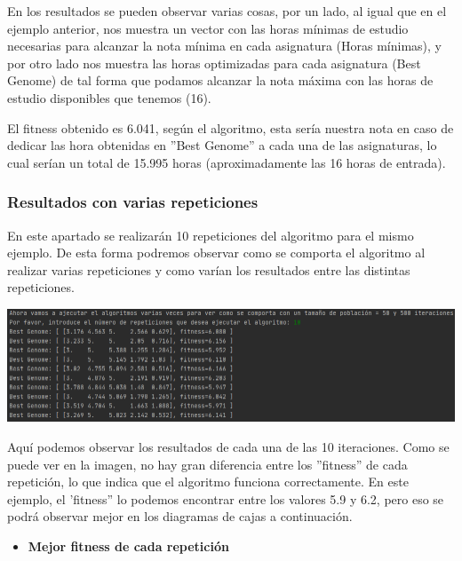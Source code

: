 \documentclass[11pt, a4paper, titlepage]{article}
\begin{document}
\vspace{5mm}

En los resultados se pueden observar varias cosas, por un lado, al igual que en el ejemplo anterior, nos muestra un vector con las horas mínimas de estudio necesarias para alcanzar la nota mínima en cada asignatura (Horas mínimas), y por otro lado nos muestra las horas optimizadas para cada asignatura (Best Genome) de tal forma que podamos alcanzar la nota máxima con las horas de estudio disponibles que tenemos (16).

\vspace{5mm}

El fitness obtenido es 6.041, según el algoritmo, esta sería nuestra nota en caso de dedicar las hora obtenidas en ''Best Genome'' a cada una de las asignaturas, lo cual serían un total de 15.995 horas (aproximadamente las 16 horas de entrada).



\subsubsection{Resultados con varias repeticiones}
En este apartado se realizarán 10 repeticiones del algoritmo para el mismo ejemplo. De esta forma podremos observar como se comporta el algoritmo al realizar varias repeticiones y como varían los resultados entre las distintas repeticiones.

\vspace{5mm}

\includegraphics[scale=0.6]{img/Res2_horas_sufi.png}

\vspace{5mm}

Aquí podemos observar los resultados de cada una de las 10 iteraciones. Como se puede ver en la imagen, no hay gran diferencia entre los ''fitness'' de cada repetición, lo que indica que el algoritmo funciona correctamente. En este ejemplo, el 'fitness'' lo podemos encontrar entre los valores 5.9 y 6.2, pero eso se podrá observar mejor en los diagramas de cajas a continuación. 

\newpage

\begin{itemize}
\item \textbf{Mejor fitness de cada repetición}
\end{itemize}
\end{document}
